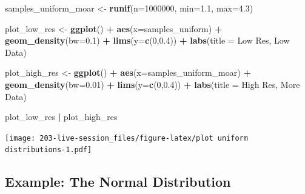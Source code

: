 \documentclass[
]{book}
\newenvironment{Shaded}{\begin{snugshade}}{\end{snugshade}}
\newcommand{\AttributeTok}[1]{\textcolor[rgb]{0.13,0.29,0.53}{#1}}
\newcommand{\DecValTok}[1]{\textcolor[rgb]{0.00,0.00,0.81}{#1}}
\newcommand{\FloatTok}[1]{\textcolor[rgb]{0.00,0.00,0.81}{#1}}
\newcommand{\FunctionTok}[1]{\textcolor[rgb]{0.13,0.29,0.53}{\textbf{#1}}}
\newcommand{\NormalTok}[1]{#1}
\newcommand{\OtherTok}[1]{\textcolor[rgb]{0.56,0.35,0.01}{#1}}
\newcommand{\SpecialCharTok}[1]{\textcolor[rgb]{0.81,0.36,0.00}{\textbf{#1}}}
\newcommand{\StringTok}[1]{\textcolor[rgb]{0.31,0.60,0.02}{#1}}
\theoremstyle{definition}
\theoremstyle{definition}
\theoremstyle{definition}
\theoremstyle{definition}
\theoremstyle{remark}
\begin{document}
\begin{Shaded}
\begin{Highlighting}[]
\NormalTok{samples\_uniform\_moar }\OtherTok{\textless{}{-}} \FunctionTok{runif}\NormalTok{(}\AttributeTok{n=}\DecValTok{1000000}\NormalTok{, }\AttributeTok{min=}\FloatTok{1.1}\NormalTok{, }\AttributeTok{max=}\FloatTok{4.3}\NormalTok{)}
\end{Highlighting}
\end{Shaded}

\begin{Shaded}
\begin{Highlighting}[]
\NormalTok{plot\_low\_res }\OtherTok{\textless{}{-}} \FunctionTok{ggplot}\NormalTok{()  }\SpecialCharTok{+} 
  \FunctionTok{aes}\NormalTok{(}\AttributeTok{x=}\NormalTok{samples\_uniform)  }\SpecialCharTok{+} 
  \FunctionTok{geom\_density}\NormalTok{(}\AttributeTok{bw=}\FloatTok{0.1}\NormalTok{)    }\SpecialCharTok{+} 
  \FunctionTok{lims}\NormalTok{(}\AttributeTok{y=}\FunctionTok{c}\NormalTok{(}\DecValTok{0}\NormalTok{,}\FloatTok{0.4}\NormalTok{))        }\SpecialCharTok{+} 
  \FunctionTok{labs}\NormalTok{(}\AttributeTok{title =} \StringTok{\textquotesingle{}Low Res, Low Data\textquotesingle{}}\NormalTok{)}

\NormalTok{plot\_high\_res }\OtherTok{\textless{}{-}} \FunctionTok{ggplot}\NormalTok{()     }\SpecialCharTok{+} 
  \FunctionTok{aes}\NormalTok{(}\AttributeTok{x=}\NormalTok{samples\_uniform\_moar) }\SpecialCharTok{+} 
  \FunctionTok{geom\_density}\NormalTok{(}\AttributeTok{bw=}\FloatTok{0.01}\NormalTok{)       }\SpecialCharTok{+} 
  \FunctionTok{lims}\NormalTok{(}\AttributeTok{y=}\FunctionTok{c}\NormalTok{(}\DecValTok{0}\NormalTok{,}\FloatTok{0.4}\NormalTok{))            }\SpecialCharTok{+} 
  \FunctionTok{labs}\NormalTok{(}\AttributeTok{title =} \StringTok{\textquotesingle{}High Res, More Data\textquotesingle{}}\NormalTok{)}

\NormalTok{plot\_low\_res }\SpecialCharTok{|}\NormalTok{ plot\_high\_res}
\end{Highlighting}
\end{Shaded}

\texttt{[image: 203-live-session\_files/figure-latex/plot uniform distributions-1.pdf]}

\hypertarget{example-the-normal-distribution}{%
\subsection{Example: The Normal Distribution}\label{example-the-normal-distribution}}
\end{document}
